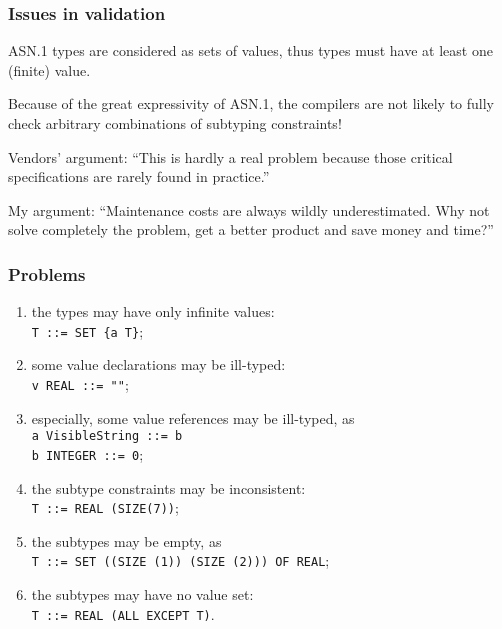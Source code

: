 \documentclass[compress,dvips,xcolor={dvipsnames},t]{beamer}
\newcommand\ASN{\textsf{ASN.1}\xspace}
\begin{document}
\begin{frame}
\frametitle{Issues in validation}

\ASN types are considered as sets of values, thus types must have at
least one (finite) value.

\bigskip

Because of the great expressivity of \ASN, the compilers are not
likely to fully check arbitrary combinations of subtyping
constraints!

\bigskip

Vendors' argument: ``This is hardly a real problem because
those critical specifications are rarely found in practice.''

\bigskip

My argument: ``Maintenance costs are always wildly underestimated. Why
not solve completely the problem, get a better product and save money
and time?''

\end{frame}


\begin{frame}
\frametitle{Problems}

\begin{enumerate}
  
  \item \label{finiteness} the types may have only infinite
        values:\\
        \texttt{T ::= SET \{a T\}};

  \item \label{type_conformance} some value declarations may be
        ill-typed:\\
        \texttt{v REAL ::= ""};

  \item \label{type_compatibility} especially, some value references
        may be ill-typed, as\\
        \texttt{a VisibleString ::= b}\\
        \texttt{b INTEGER ::= 0};

  \item \label{constraint_consistence} the subtype constraints may
        be inconsistent:\\
        \texttt{T ::= REAL (SIZE(7))};

  \item \label{subtype_non_emptyness} the subtypes may be empty, as\\
        \texttt{T ::= SET ((SIZE (1))  (SIZE (2))) OF REAL};
        
  \item \label{solvability} the subtypes may have no value set:\\
        \texttt{T ::= REAL (ALL EXCEPT T)}. 

\end{enumerate}

\end{frame}
\end{document}
